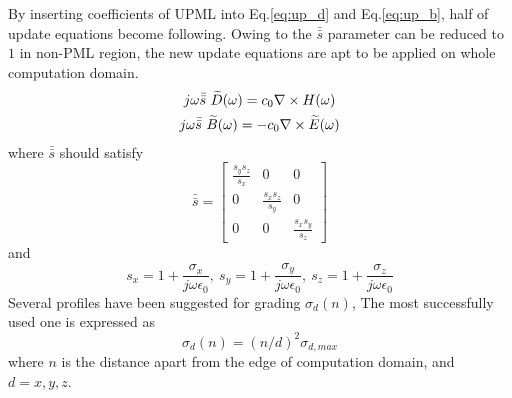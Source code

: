 By inserting coefficients of UPML into Eq.\ref{eq:up_d} and Eq.\ref{eq:up_b}, half of update equations become
following. Owing to the $\bar{\bar{s}}$ parameter can be reduced to $1$ in non-PML region, the new update equations are
apt to be applied on whole computation domain.
\begin{gather}
  j\omega\bar{\bar{s}}\ \widetilde{D}(\omega) = c_0\nabla\times H(\omega)\\
  j\omega\bar{\bar{s}}\ \widetilde{B}(\omega) = -c_0\nabla\times \widetilde{E}(\omega)
\end{gather}
where $\bar{\bar{s}}$ should satisfy
\begin{equation}
  \bar{\bar{s}} = 
  \begin{bmatrix}
    \displaystyle\frac{s_ys_z}{s_x}& 0& 0\\
    0& \displaystyle\frac{s_xs_z}{s_y}& 0\\
    0& 0& \displaystyle\frac{s_xs_y}{s_z}
  \end{bmatrix}
\end{equation}
and 
\begin{equation}
  s_x = 1 + \frac{\sigma_x}{j\omega\epsilon_0},\ 
  s_y = 1 + \frac{\sigma_y}{j\omega\epsilon_0},\ 
  s_z = 1 + \frac{\sigma_z}{j\omega\epsilon_0}
\end{equation}
Several profiles have been suggested for grading $\sigma_d(n)$, The most successfully used one is expressed as
\begin{equation}
  \sigma_d(n) = (n/d)^2\sigma_{d,max}
\end{equation}
where $n$ is the distance apart from the edge of computation domain, and $d = x,y,z$.

